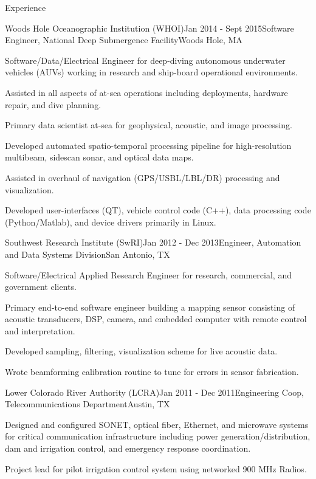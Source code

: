 \documentclass{resume} %
\begin{document}
\begin{rSection}{Experience}

\begin{rSubsection}{Woods Hole Oceanographic Institution (WHOI)}{Jan 2014 - Sept 2015}{Software Engineer, National Deep Submergence Facility}{Woods Hole, MA}
\item{Software/Data/Electrical Engineer for deep-diving autonomous underwater vehicles (AUVs) working in research and ship-board operational environments.}
\item{Assisted in all aspects of at-sea operations including deployments, hardware repair, and dive planning.}
\item{Primary data scientist at-sea for geophysical, acoustic, and image processing.}
\item{Developed automated spatio-temporal processing pipeline for high-resolution multibeam, sidescan sonar, and optical data maps.}
\item{Assisted in overhaul of navigation (GPS/USBL/LBL/DR) processing and visualization.}
\item{Developed user-interfaces (QT), vehicle control code (C++), data processing code (Python/Matlab), and device drivers primarily in Linux.}
\end{rSubsection}
%
\begin{rSubsection}{Southwest Research Institute (SwRI)}{Jan 2012 - Dec 2013}{Engineer, Automation and Data Systems Division}{San Antonio, TX}{}
\item{Software/Electrical Applied Research Engineer for research, commercial, and government clients.}
\item{Primary end-to-end software engineer building a mapping sensor consisting of acoustic transducers, DSP, camera, and embedded computer with remote control and interpretation.}
\item{Developed sampling, filtering, visualization scheme for live acoustic data.}
\item{Wrote beamforming calibration routine to tune for errors in sensor fabrication.}
\end{rSubsection}

\hfill \break

\begin{rSubsection}{Lower Colorado River Authority (LCRA)}{Jan 2011 - Dec 2011}{Engineering Coop, Telecommunications Department}{Austin, TX}
\item{Designed and configured SONET, optical fiber, Ethernet, and microwave systems for critical communication infrastructure including power generation/distribution, dam and 
            irrigation control, and emergency response coordination. }
\item{Project lead for pilot irrigation control system using networked 900 MHz Radios.}
\end{rSubsection}


\end{rSection}
\end{document}
